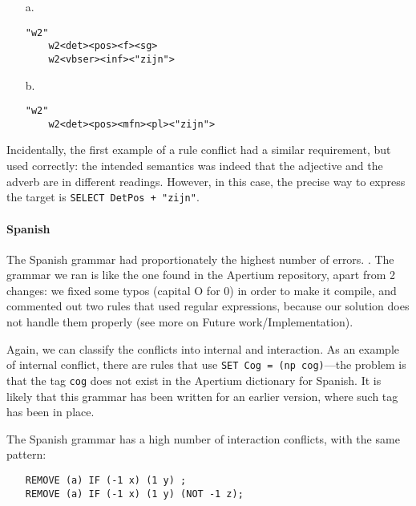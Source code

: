 \begin{itemize}
\item[a.] \begin{verbatim}
"w2"
    w2<det><pos><f><sg>
    w2<vbser><inf><"zijn">
\end{verbatim}

\item[b.] \begin{verbatim}
"w2"
    w2<det><pos><mfn><pl><"zijn">
\end{verbatim}
\end{itemize}

Incidentally, the first example of a rule conflict had a similar
requirement, but used correctly: the intended semantics was indeed
that the adjective and the adverb are in different readings. However,
in this case, the precise way to express the target is \texttt{SELECT DetPos + "zijn"}.


\paragraph{Spanish} The Spanish grammar had proportionately the highest number of errors. .  The grammar we ran is like the one found in the Apertium repository, apart from 2 changes: we fixed some typos (capital O for 0) in order to make it compile, and commented out two rules that used regular expressions, because our solution does not handle them properly (see more on Future work/Implementation).

Again, we can classify the conflicts into internal and interaction. As an example of internal conflict, there are  rules that use \texttt{SET Cog = (np cog)}---the problem is that the tag \texttt{cog} does not exist in the Apertium dictionary for Spanish. It is likely that this grammar has been written for an earlier version, where such tag has been in place.




The Spanish grammar has a high number of interaction conflicts,  with the same pattern:

\begin{itemize}
\item[] 
\begin{verbatim}REMOVE (a) IF (-1 x) (1 y) ;
REMOVE (a) IF (-1 x) (1 y) (NOT -1 z);
\end{verbatim}
\end{itemize}



